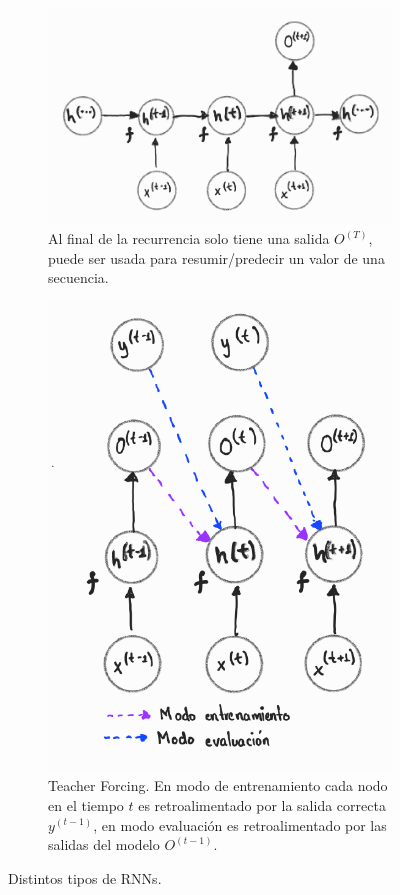 \begin{figure}[!ht]
    \begin{subfigure}[b]{0.4\textwidth}
        \centering
        \includegraphics[height=0.63\textwidth]{Chapters/1. Transformer/Figures/rnn/rnn_cfgc.png}
        \caption{Al final de la recurrencia solo tiene una salida $O^{(T)}$, puede ser usada para
        resumir/predecir un valor de una secuencia.}
        \label{fig:rnn_cfgc}
    \end{subfigure}
    \hfill
    \begin{subfigure}[b]{0.49\textwidth}
        \centering
        \includegraphics[height=0.6\textwidth]{Chapters/1. Transformer/Figures/rnn/rnn_cfgd.png}
        \caption{Teacher Forcing. En modo de entrenamiento cada nodo en el tiempo $t$ es
        retroalimentado por la salida correcta $y^{(t-1)}$, en modo evaluación es retroalimentado por las
        salidas del modelo $O^{(t-1)}$.}
        \label{fig:rnn_cfgd}
    \end{subfigure}

    \caption[RNN - CFG]{Distintos tipos de RNNs.}
    \label{fig:three graphs}
\end{figure}


